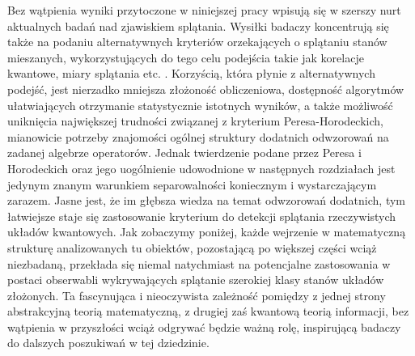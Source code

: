 Bez wątpienia wyniki przytoczone w niniejszej pracy wpisują się w szerszy nurt
aktualnych badań nad zjawiskiem splątania.
Wysiłki badaczy koncentrują się także na podaniu alternatywnych kryteriów
orzekających o splątaniu stanów mieszanych,
wykorzystujących do tego celu podejścia takie jak korelacje kwantowe,
miary splątania etc.
\cite{modi2010unified,ollivier2001quantum}.
Korzyścią, która płynie z alternatywnych podejść,
jest nierzadko mniejsza złożoność obliczeniowa,
dostępność algorytmów ułatwiających otrzymanie statystycznie istotnych wyników,
a także możliwość uniknięcia największej trudności związanej z kryterium
Peresa-Horodeckich,
mianowicie potrzeby znajomości ogólnej struktury dodatnich odwzorowań
na zadanej algebrze operatorów.
Jednak twierdzenie podane przez Peresa i Horodeckich oraz
jego uogólnienie udowodnione w następnych rozdziałach
jest jedynym znanym warunkiem separowalności
koniecznym i wystarczającym zarazem.
Jasne jest,
że im głębsza wiedza na temat odwzorowań dodatnich,
tym łatwiejsze staje się zastosowanie kryterium do detekcji splątania
rzeczywistych układów kwantowych.
Jak zobaczymy poniżej,
każde wejrzenie w matematyczną strukturę analizowanych tu obiektów,
pozostającą po większej części wciąż niezbadaną,
przekłada się niemal natychmiast na potencjalne zastosowania w postaci
obserwabli wykrywających splątanie szerokiej klasy stanów układów złożonych.
Ta fascynująca i nieoczywista zależność pomiędzy z jednej strony abstrakcyjną
teorią matematyczną,
z drugiej zaś kwantową teorią informacji,
bez wątpienia w przyszłości wciąż odgrywać będzie ważną rolę,
inspirującą badaczy do dalszych poszukiwań w tej dziedzinie.

